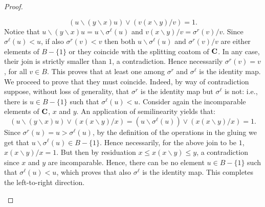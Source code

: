 \documentclass{amsart}
\theoremstyle{definition}
\numberwithin{equation}{section}
\newcommand{\alg}[1]{{\textbf{\upshape #1}}}  %
\newcommand{\sell}{\sigma^\ell}
\newcommand{\sr}{\sigma^r}
\begin{document}
\begin{proof}
\begin{enumerate}
		$$(u\backslash(y \backslash x)u) \lor  (v(x \backslash y )/ v)=1.$$
	Notice that $u\backslash(y \backslash x)u = u \backslash \sell(u)$ and $v(x \backslash y )/ v = \sr(v) / v$. Since $\sell(u) < u$, if also $\sr(v) < v$ then both $u \backslash \sell(u)$ and $\sr(v) / v$ are either elements of $B - \{1\}$ or they coincide with the splitting coatom of $\alg C$. In any case, their join is strictly smaller than $1$, a contradiction. Hence necessarily $\sr(v) = v$, for all $v \in B$. This proves that at least one among $\sr$ and $\sell$ is the identity map. We proceed to prove that they must coincide. Indeed, by way of contradiction suppose, without loss of generality, that $\sr$ is the identity map but $\sell$ is not: i.e., there is $u \in B-\{1\}$ such that $\sell(u) < u$. Consider again the incomparable elements of $\alg C$, $x$ and $y$. An application of semilinearity yields that:
	$$(u\backslash(y \backslash x)u) \lor  (x(x \backslash y )/ x)= (u \backslash \sell(u)) \lor (x(x \backslash y )/ x) =1.$$
	Since $\sr(u) = u > \sell(u)$, by the definition of the operations in the gluing we get that $u \backslash \sell(u) \in B-\{1\}$. Hence necessarily, for the above join to be $1$, $x(x \backslash y )/ x = 1$. But then by residuation $x \leq x(x \backslash y ) \leq y$, a contradiction since $x$ and $y$ are incomparable. Hence, there can be no element $u \in B-\{1\}$ such that $\sell(u) < u$, which proves that also $\sell$ is the identity map. This completes the left-to-right direction.
		

\end{enumerate}
\end{proof}
\end{document}
